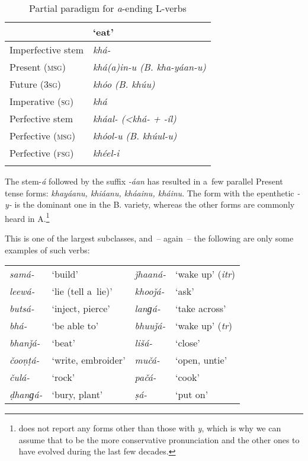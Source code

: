 \begin{table}[ht]
\caption{Partial paradigm for \textit{a}-ending L-verbs}
\begin{tabularx}{.75\textwidth}{ Q Q }
\lsptoprule
&
`eat'\\\hline
Imperfective stem &
\textit{khá-} \\
Present (\textsc{msg}) &
\textit{khá(a)in-u (B. kha-yáan-u)}\\
Future (\textsc{3sg}) &
\textit{khóo (B. khúu)}\\
Imperative (\textsc{sg}) &
\textit{khá} \\
Perfective stem &
\textit{kháal- ({\textless}khá- + -íl)}\\
Perfective (\textsc{msg}) &
\textit{khóol-u (B. khúul-u)}\\
Perfective (\textsc{fsg}) &
\textit{khéel-i} \\\lspbottomrule
\end{tabularx}
\label{tab:8-5}
\end{table}


The stem-\textit{á} followed by the suffix \textit{-áan} has resulted in a~few parallel Present tense forms: \textit{khayáanu, khiáanu, kháainu, kháinu}. The form with the epenthetic \textit{-y-} is the dominant one in the B. variety, whereas the other forms are commonly heard in A.\footnote{\citet[22]{morgenstierne1941} does not report any forms other than those with \textit{y}, which is why we can assume that to be the more conservative pronunciation and the other ones to have evolved during the last few decades.} 


This is one of the largest subclasses, and~-- again~-- the following are only some examples of such verbs:


\begin{table}[H]
\begin{tabularx}{\textwidth}{ l@{\hspace{20pt}} Q l@{\hspace{20pt}} Q }
\textit{samá-} &
`build' &
\textit{ǰhaaná-} &
`wake up' (\textit{itr})\\
\textit{leewá-} &
`lie (tell a~lie)' &
\textit{khooǰá-} &
`ask'\\
\textit{butsá-} &
`inject, pierce' &
\textit{lanɡá-} &
`take across'\\
\textit{bhá-} &
`be able to' &
\textit{bhuuǰá-} &
`wake up' (\textit{tr})\\
\textit{bhanǰá-} &
`beat' &
\textit{lišá-} &
`close'\\
\textit{čooṇṭá-} &
`write, embroider' &
\textit{mučá-} &
`open, untie'\\
\textit{čulá-} &
`rock' &
\textit{pačá-} &
`cook'\\
\textit{ḍhanɡá-} &
`bury, plant' &
\textit{ṣá-} &
`put on'\\
\end{tabularx}
\end{table}

